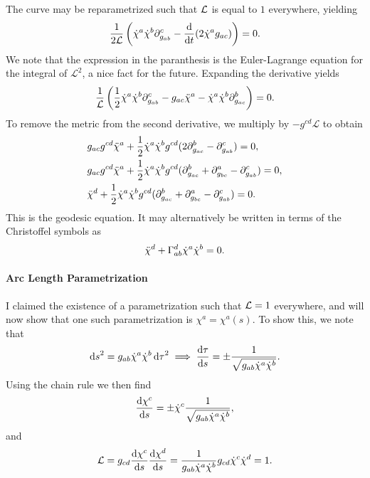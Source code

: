 The curve may be reparametrized such that $\mathcal{L}$ is equal to $1$ everywhere, yielding
\begin{align*}
	\frac{1}{2\mathcal{L}}\left(\dot{\chi}^{a}\dot{\chi}^{b}\partial^{c}_{g_{ab}} - \dv{t}(2\dot{\chi}^{a}g_{ac})\right) = 0.
\end{align*}
We note that the expression in the paranthesis is the Euler-Lagrange equation for the integral of $\mathcal{L}^{2}$, a nice fact for the future. Expanding the derivative yields
\begin{align*}
	\frac{1}{\mathcal{L}}\left(\frac{1}{2}\dot{\chi}^{a}\dot{\chi}^{b}\partial^{c}_{g_{ab}} - g_{ac}\ddot{\chi}^{a} - \dot{\chi}^{a}\dot{\chi}^{b}\partial^{b}_{g_{ac}}\right) = 0.
\end{align*}
To remove the metric from the second derivative, we multiply by $-g^{cd}\mathcal{L}$ to obtain
\begin{align*}
	&g_{ac}g^{cd}\ddot{\chi}^{a} + \frac{1}{2}\dot{\chi}^{a}\dot{\chi}^{b}g^{cd}(2\partial^{b}_{g_{ac}} - \partial^{c}_{g_{ab}}) = 0, \\
	&g_{ac}g^{cd}\ddot{\chi}^{a} + \frac{1}{2}\dot{\chi}^{a}\dot{\chi}^{b}g^{cd}(\partial^{b}_{g_{ac}} + \partial^{a}_{g_{bc}} - \partial^{c}_{g_{ab}}) = 0, \\
	&\ddot{\chi}^{d} + \frac{1}{2}\dot{\chi}^{a}\dot{\chi}^{b}g^{cd}(\partial^{b}_{g_{ac}} + \partial^{a}_{g_{bc}} - \partial^{c}_{g_{ab}}) = 0.
\end{align*}
This is the geodesic equation. It may alternatively be written in terms of the Christoffel symbols as
\begin{align*}
	\ddot{\chi}^{d} + \chris{d}{a}{b}\dot{\chi}^{a}\dot{\chi}^{b} = 0.
\end{align*}

\paragraph{Arc Length Parametrization}
I claimed the existence of a parametrization such that $\mathcal{L} = 1$ everywhere, and will now show that one such parametrization is $\chi^{a} = \chi^{a}(s)$. To show this, we note that
\begin{align*}
	\dd{s}^{2} = g_{ab}\dot{\chi}^{a}\dot{\chi}^{b}\dd{\tau}^{2} \implies \dv{\tau}{s} = \pm\frac{1}{\sqrt{g_{ab}\dot{\chi}^{a}\dot{\chi}^{b}}}.
\end{align*}
Using the chain rule we then find
\begin{align*}
	\dv{\chi^{c}}{s} = \pm\dot{\chi}^{c}\frac{1}{\sqrt{g_{ab}\dot{\chi}^{a}\dot{\chi}^{b}}},
\end{align*}
and
\begin{align*}
	\mathcal{L} = g_{cd}\dv{\chi^{c}}{s}\dv{\chi^{d}}{s} = \frac{1}{g_{ab}\dot{\chi}^{a}\dot{\chi}^{b}}g_{cd}\dot{\chi}^{c}\dot{\chi}^{d} = 1.
\end{align*}

